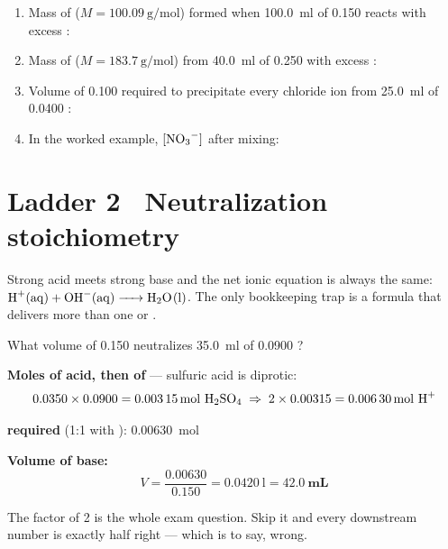 \documentclass{apchem-worksheet}
\begin{document}
\begin{yourturn}
\begin{enumerate}[leftmargin=*,itemsep=0.5em]
  \item Mass of  ($M = \SI{100.09}{\gram\per\mole}$) formed
        when \SI{100.0}{\milli\litre} of \SI{0.150}{\Molar} 
        reacts with excess : \workspace[1.8cm]
  \item Mass of  ($M = \SI{183.7}{\gram\per\mole}$) from
        \SI{40.0}{\milli\litre} of \SI{0.250}{\Molar}  with
        excess : \workspace[1.8cm]
  \item Volume of \SI{0.100}{\Molar}  required to precipitate
        every chloride ion from \SI{25.0}{\milli\litre} of
        \SI{0.0400}{\Molar} : \workspace[2cm]
  \item In the worked example, $[\ce{NO3-}]$ after mixing:
        \workspace[1.6cm]
\end{enumerate}
\end{yourturn}

\section*{\sffamily Ladder 2 \textbullet\ Neutralization stoichiometry}

Strong acid meets strong base and the net ionic equation is always the
same: $\ce{H+(aq) + OH-(aq) -> H2O(l)}$. The only bookkeeping trap is a
formula that delivers more than one  or .

\begin{workedexample}
What volume of \SI{0.150}{\Molar}  neutralizes
\SI{35.0}{\milli\litre} of \SI{0.0900}{\Molar} ?

\textbf{Moles of acid, then of } --- sulfuric acid is diprotic:
\[ 0.0350 \times 0.0900 = \SI{0.00315}{\mole}~\ce{H2SO4}
   \;\Rightarrow\; 2 \times 0.00315 = \SI{0.00630}{\mole}~\ce{H+} \]

\textbf{ required} (1:1 with ): \SI{0.00630}{\mole}

\textbf{Volume of base:}
\[ V = \frac{0.00630}{0.150} = \SI{0.0420}{\litre} = \mathbf{42.0~mL} \]

The factor of 2 is the whole exam question. Skip it and every downstream
number is exactly half right --- which is to say, wrong.
\end{workedexample}
\end{document}
